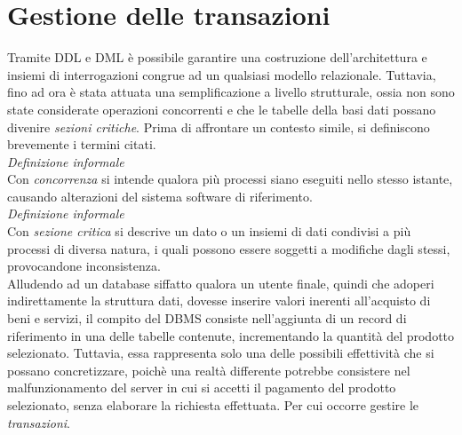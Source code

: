 \documentclass{article}
\begin{document}
\pagestyle{empty}

\section*{Gestione delle transazioni} 
\large
Tramite DDL e DML è possibile garantire una costruzione dell'architettura e insiemi di interrogazioni congrue ad un qualsiasi modello relazionale. Tuttavia, fino ad ora è stata attuata una semplificazione a livello strutturale, ossia non sono state considerate operazioni concorrenti e che le tabelle della basi dati possano divenire  \textit{sezioni critiche}. Prima di affrontare un contesto simile, si definiscono brevemente i termini citati.\vspace*{14pt}\\
\textit{Definizione informale}\\
Con \textit{concorrenza} si intende qualora più processi siano eseguiti nello stesso istante, causando alterazioni del sistema software di riferimento.\vspace*{14pt}\\
\textit{Definizione informale}\\
Con \textit{sezione critica} si descrive un dato o un insiemi di dati condivisi a più processi di diversa natura, i quali possono essere soggetti a modifiche dagli stessi, provocandone inconsistenza.\vspace*{14pt}\\
Alludendo ad un database siffatto qualora un utente finale, quindi che adoperi indirettamente la struttura dati, dovesse inserire valori inerenti all'acquisto di beni e servizi, il compito del DBMS consiste nell'aggiunta di un record di riferimento in una delle tabelle contenute, incrementando la quantità del prodotto selezionato. Tuttavia, essa rappresenta solo una delle possibili effettività che si possano concretizzare, poichè una realtà differente potrebbe consistere nel malfunzionamento del server in cui si accetti il pagamento del prodotto selezionato, senza elaborare la richiesta effettuata. Per cui occorre gestire le \textit{transazioni}.
\end{document}
